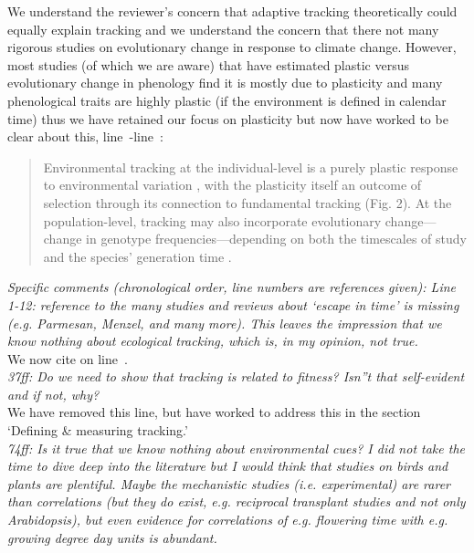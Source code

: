 \documentclass[11pt]{article}
\newcommand{\lr}[1]{line~\lineref{#1}}
\begin{document}
We understand the reviewer's concern that adaptive tracking \citep[\emph{sensu}][]{simons2011} theoretically could equally explain tracking and we understand the concern that there not many rigorous studies on evolutionary change in response to climate change. However, most studies (of which we are aware) that have estimated plastic versus evolutionary change in phenology find it is mostly due to plasticity and many phenological traits are highly plastic (if the environment is defined in calendar time) thus we have retained our focus on plasticity but now have worked to be clear about this, \lr{Bminusbstart}-\lr{moretrackE}:
\begin{quote}
Environmental tracking at the individual-level is a purely plastic response to environmental variation \citep[in line with current findings on most climate change responses,][]{bonamour2019}, with the plasticity itself an outcome of selection \citep{chevin2010} through its connection to fundamental tracking (Fig. 2). At the population-level, tracking may also incorporate evolutionary change---change in genotype frequencies---depending on both the timescales of study and the species' generation time \citep[this evolutionary response can be predicted as the difference between the environmental sensitivity of phenotypic selection and an organism's plasticity, $|B-b|$ in][]{chevin2010}.
\end{quote}

\emph{Specific comments (chronological order, line numbers are references given):
Line 1-12: reference to the many studies and reviews about `escape in time' is missing (e.g.
Parmesan, Menzel, and many more). This leaves the impression that we know nothing about
ecological tracking, which is, in my opinion, not true.}\\

We now cite \citet{Menzel:2006xn,Parmesan:2006cr} on \lr{r1ass}.\\

\emph{37ff: Do we need to show that tracking is related to fitness? Isn''t that self-evident and if
not, why?}\\

We have removed this line, but have worked to address this in the section `Defining \& measuring tracking.'\\

\emph{74ff: Is it true that we know nothing about environmental cues? I did not take the time to
dive deep into the literature but I would think that studies on birds and plants are
plentiful. Maybe the mechanistic studies (i.e. experimental) are rarer than correlations (but
they do exist, e.g. reciprocal transplant studies and not only Arabidopsis), but even
evidence for correlations of e.g. flowering time with e.g. growing degree day units is
abundant.}\\
\end{document}
